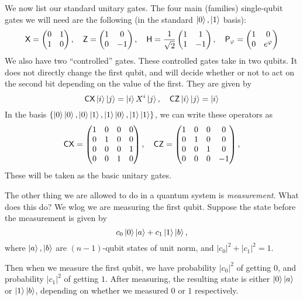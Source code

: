 We now list our standard unitary gates. The four main (families) single-qubit gates we will need are the following (in the standard $\left\lvert 0\right\rangle, \left\lvert 1\right\rangle$ basis):
\[
  \mathsf{X} =
  \begin{pmatrix}
    0 & 1\\
    1 & 0
  \end{pmatrix},\quad
  \mathsf{Z} =
  \begin{pmatrix}
    1 & 0\\
    0 & -1
  \end{pmatrix},\quad
  \mathsf{H} = \frac{1}{\sqrt{2}}
  \begin{pmatrix}
    1 & 1\\
    1 & -1
  \end{pmatrix},\quad
  \mathsf{P}_\varphi =
  \begin{pmatrix}1 & 0\\0 & e^{\varphi}\end{pmatrix}
\]
We also have two ``controlled'' gates. These controlled gates take in two qubits. It does not directly change the first qubit, and will decide whether or not to act on the second bit depending on the value of the first. They are given by
\[
  \mathsf{CX}\left\lvert i\right\rangle\left\lvert j\right\rangle = \left\lvert i\right\rangle X^i\left\lvert j\right\rangle,\quad \mathsf{CZ} \left\lvert i\right\rangle\left\lvert j\right\rangle = \left\lvert i\right\rangle
\]
In the basis $\{\left\lvert 0\right\rangle\left\lvert 0\right\rangle, \left\lvert 0\right\rangle\left\lvert 1\right\rangle, \left\lvert 1\right\rangle\left\lvert 0\right\rangle, \left\lvert 1\right\rangle\left\lvert 1\right\rangle\}$, we can write these operators as
\[
  \mathsf{CX} =
  \begin{pmatrix}
    1 & 0 & 0 & 0\\
    0 & 1 & 0 & 0\\
    0 & 0 & 0 & 1\\
    0 & 0 & 1 & 0
  \end{pmatrix},\quad
  \mathsf{CZ} =
  \begin{pmatrix}
    1 & 0 & 0 & 0\\
    0 & 1 & 0 & 0\\
    0 & 0 & 1 & 0\\
    0 & 0 & 0 & -1
  \end{pmatrix},
\]
These will be taken as the basic unitary gates.

The other thing we are allowed to do in a quantum system is \emph{measurement}. What does this do? We wlog we are measuring the first qubit. Suppose the state before the measurement is given by
\[
  c_0 \left\lvert 0\right\rangle \left\lvert a\right\rangle + c_1 \left\lvert 1\right\rangle\left\lvert b\right\rangle,
\]
where $\left\lvert a\right\rangle, \left\lvert b\right\rangle$ are $(n-1)$-qubit states of unit norm, and $|c_0|^2 + |c_1|^2 = 1$.

Then when we measure the first qubit, we have probability $|c_0|^2$ of getting $0$, and probability $|c_1|^2$ of getting $1$. After measuring, the resulting state is either $\left\lvert 0\right\rangle\left\lvert a\right\rangle$ or $\left\lvert 1\right\rangle\left\lvert b\right\rangle$, depending on whether we measured $0$ or $1$ respectively.


